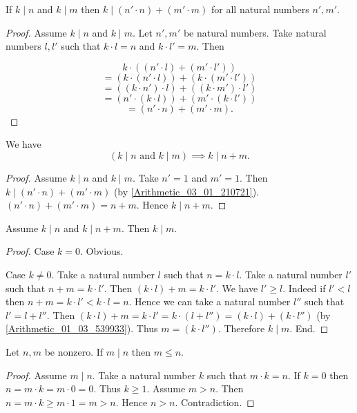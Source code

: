 \documentclass[../../arithmetic.tex]{subfiles}
\begin{document}
\begin{forthel}
    \begin{proposition}\label{Arithmetic_03_01_210721}
      If $k \mid n$ and $k \mid m$ then $k \mid (n' \cdot n) + (m' \cdot m)$ for all natural numbers $n',m'$.
    \end{proposition}
    \begin{proof}
      Assume $k \mid n$ and $k \mid m$.
      Let $n',m'$ be natural numbers.
      Take natural numbers $l,l'$ such that $k \cdot l = n$ and $k \cdot l' = m$.
      Then

      \[   k \cdot ((n' \cdot l) + (m' \cdot l')) \]
      \[ = (k \cdot (n' \cdot l)) + (k \cdot (m' \cdot l')) \]
      \[ = ((k \cdot n') \cdot l) + ((k \cdot m') \cdot l') \]
      \[ = (n' \cdot (k \cdot l)) + (m' \cdot (k \cdot l')) \]
      \[ = (n' \cdot n) + (m' \cdot m). \]
    \end{proof}

    \begin{corollary}\label{Arithmetic_03_01_655411}
      We have \[ (\text{$k \mid n$ and $k \mid m$}) \implies k \mid n + m. \]
    \end{corollary}
    \begin{proof}
      Assume $k \mid n$ and $k \mid m$.
      Take $n' = 1$ and $m' = 1$.
      Then $k \mid (n' \cdot n) + (m' \cdot m)$ (by \ref{Arithmetic_03_01_210721}).
      $(n' \cdot n) + (m' \cdot m) = n + m$.
      Hence $k \mid n + m$.
    \end{proof}

    \begin{proposition}\label{Arithmetic_03_01_695362}
      Assume $k \mid n$ and $k \mid n + m$.
      Then $k \mid m$.
    \end{proposition}
    \begin{proof}
      Case $k = 0$. Obvious.

      Case $k \neq 0$.
        Take a natural number $l$ such that $n = k \cdot l$.
        Take a natural number $l'$ such that $n + m = k \cdot l'$.
        Then $(k \cdot l) + m = k \cdot l'$.
        We have $l' \geq l$.
        Indeed if $l' < l$ then $n + m = k \cdot l' < k \cdot l = n$.
        Hence we can take a natural number $l''$ such that $l' = l + l''$.
        Then $(k \cdot l) + m = k \cdot l' = k \cdot (l + l'') = (k \cdot l) + (k \cdot l'')$ (by \ref{Arithmetic_01_03_539933}).
        Thus $m = (k \cdot l'')$.
        Therefore $k \mid m$.
      End.
    \end{proof}

    \begin{proposition}\label{Arithmetic_03_01_376821}
      Let $n,m$ be nonzero.
      If $m \mid n$ then $m \leq n$.
    \end{proposition}
    \begin{proof}
      Assume $m \mid n$.
      Take a natural number $k$ such that $m \cdot k = n$.
      If $k = 0$ then $n = m \cdot k = m \cdot 0 = 0$.
      Thus $k \geq 1$.
      Assume $m > n$.
      Then $n = m \cdot k \geq m \cdot 1 = m > n$.
      Hence $n > n$.
      Contradiction.
    \end{proof}


\end{forthel}
\end{document}
